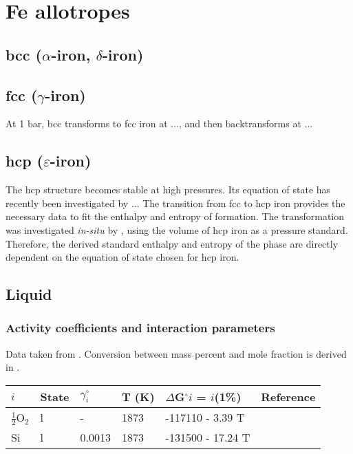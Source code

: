 \documentclass[11pt,a4paper,english]{article}
\begin{document}
\section{Fe allotropes}
\subsection{bcc ($\alpha$-iron, $\delta$-iron)}
\subsection{fcc ($\gamma$-iron)}
At 1 bar, bcc transforms to fcc iron at ..., and then backtransforms at ...
\subsection{hcp ($\varepsilon$-iron)}
The hcp structure becomes stable at high pressures. Its equation of state has recently been investigated by ... 
The transition from fcc to hcp iron provides the necessary data to fit the enthalpy and entropy of formation. The transformation was investigated \emph{in-situ} by \cite{KFMP2009}, using the volume of hcp iron as a pressure standard. Therefore, the derived standard enthalpy and entropy of the phase are directly dependent on the equation of state chosen for hcp iron.
\subsection{Liquid}
\subsubsection{Activity coefficients and interaction parameters}
Data taken from \cite{steelbook}. Conversion between mass percent and mole fraction is derived in \cite{LE1966}.

\begin{table}[h]
\begin{tabular}{llllll}
$i$                  & State & $\gamma^{\circ}_i$ & T (K) & $\Delta$G$^{\circ}i$ = $i$(1\%) & Reference  \\
\hline
$\frac{1}{2}$O$_2$ & l     & -        & 1873  & -117110 - 3.39 T               & \cite{SS1959} \\
Si                 & l     & 0.0013   & 1873  & -131500 - 17.24 T              & \cite{SE1974}     
\end{tabular}
\end{table}
\end{document}
